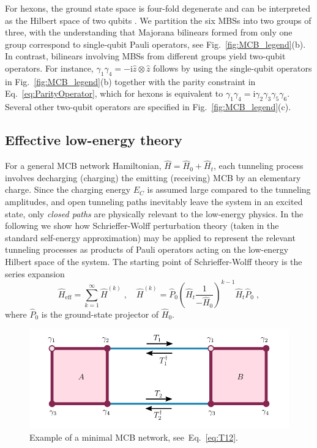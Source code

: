 \documentclass[twocolumn,floats,prx,showpacs]{revtex4-1}
\begin{document}
For hexons, the ground state space is four-fold degenerate and can be interpreted as the Hilbert space of two qubits \cite{Karzig2017}. We partition the six MBSs into two groups of three, with the understanding that Majorana bilinears formed from only one group correspond to single-qubit Pauli operators,
see Fig.~\ref{fig:MCB_legend}(b).  In contrast, bilinears involving MBSs from different groups  
yield two-qubit operators. For instance, $\gamma_1 \gamma_4 = - \mathrm i \hat z \otimes \hat z$ 
follows by using the single-qubit operators in Fig.~\ref{fig:MCB_legend}(b) together with the 
parity constraint in Eq.~\eqref{eq:ParityOperator}, which for hexons is equivalent to $\gamma_1 \gamma_4 = \mathrm i \gamma_2 \gamma_3 \gamma_5 \gamma_6$. Several other two-qubit operators are specified in Fig.~\ref{fig:MCB_legend}(c). 

\subsection{Effective low-energy theory}\label{sec2d}

For a general MCB network Hamiltonian, $\hat H=\hat H_0+\hat H_t$, 
each tunneling process involves decharging (charging) the emitting (receiving) MCB by an elementary charge. Since the charging energy $E_C$ is assumed large compared to the tunneling amplitudes, and open tunneling paths inevitably leave the system in an excited state, only  
\emph{closed paths} are physically relevant to the low-energy physics. In the following we show how Schrieffer-Wolff perturbation theory (taken in the standard self-energy approximation) \cite{Bravyi2011} may be applied to represent the relevant tunneling processes as products of Pauli operators acting on the low-energy Hilbert space of the system. 
The starting point of Schrieffer-Wolff theory is the series expansion
\begin{equation}\label{eq:series} 
\hat H_\text{eff}=\sum_{k=1}^\infty\hat H^{(k)}\;,\quad
\hat H^{(k)}=\hat P_0 \left(\hat H_t \frac{1}{-\hat H_0} \right)^{k-1} \hat H_t \hat P_0 \;,
\end{equation}
where $\hat P_0$ is the ground-state projector of $\hat H_0$.

\begin{figure}%
\includegraphics[width=\columnwidth]{fig/example.pdf}%
\caption{Example of a minimal MCB network, see~Eq.~\eqref{eq:T12}.} %
\label{fig:example}%
\end{figure}
\end{document}
